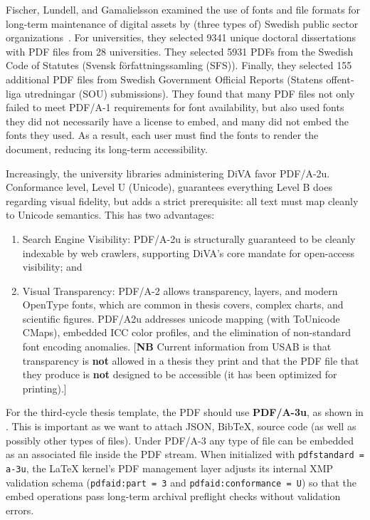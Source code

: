 \documentclass[12pt, twoside]{article}
\begin{document}
Fischer, Lundell, and Gamalielsson examined the use of fonts and file formats for long-term maintenance of digital assets by (three types of) Swedish public sector organizations~\cite{fischer_pdfconformance_2023}. For universities, they selected \num{9341} unique doctoral dissertations with \gls{PDF} files from 28 universities. They selected \num{5931} \glspl{PDF} from the Swedish Code of
Statutes (\foreignlanguage{swedish}{Svensk författningssamling} (SFS)). Finally, they selected \num{155} additional \gls{PDF} files from Swedish Government Official Reports (\foreignlanguage{swedish}{Statens offentliga utredningar} (SOU) submissions). They found that many \gls{PDF} files not only failed to meet PDF/A-1 requirements for font availability, but also used fonts they did not necessarily have a license to embed, and many did not embed the fonts they used. As a result, each user must find the fonts to render the document, reducing its long-term accessibility.

Increasingly, the university libraries administering \gls{DiVA} favor PDF/A-2u. Conformance level, \ie Level U (Unicode), guarantees everything Level B does regarding visual fidelity, but adds a strict prerequisite: all text must map cleanly to Unicode semantics. This has two advantages:
\begin{enumerate}
    \item Search Engine Visibility: PDF/A-2u is structurally guaranteed to be cleanly indexable by web crawlers, supporting \gls{DiVA}'s core mandate for open-access visibility; and
    
    \item Visual Transparency: PDF/A-2 allows transparency, layers, and modern OpenType fonts, which are common in thesis covers, complex charts, and scientific figures. PDF/A2u addresses unicode mapping (with ToUnicode CMaps), embedded ICC color profiles, and the elimination of non-standard font encoding anomalies. [\textbf{NB} Current information from USAB is that transparency is \textbf{not} allowed in a thesis they print and that the \gls{PDF} file that they produce is \textbf{not} designed to be accessible (\ie it has been optimized for printing).]
\end{enumerate}

For the third-cycle thesis template, the \gls{PDF} should use \textbf{PDF/A-3u}, as shown in . This is important as we want to attach JSON, BibTeX, source code (as well as possibly other types of files). Under PDF/A-3 any type of file can be embedded as an associated file inside the PDF stream.
When initialized with \texttt{pdfstandard = a-3u}, the \LaTeX{} kernel's \gls{PDF} management layer adjusts its internal \gls{XMP} validation schema (\texttt{pdfaid:part = 3} and \texttt{pdfaid:conformance = U}) so that the embed operations pass long-term archival preflight checks without validation errors.
\end{document}
